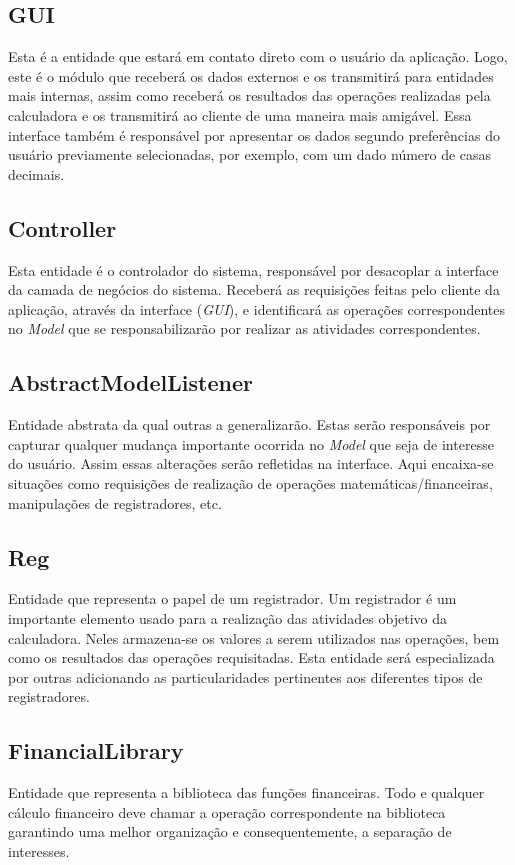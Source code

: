 \subsection{GUI}
Esta é a entidade que estará em contato direto com o usuário da aplicação. Logo, este é o módulo que receberá os dados externos e os transmitirá para entidades mais internas, assim como receberá os resultados das operações realizadas pela calculadora e os transmitirá ao cliente de uma maneira mais amigável. Essa interface também é responsável por apresentar os dados segundo preferências do usuário previamente selecionadas, por exemplo, com um dado número de casas decimais.

\subsection{Controller}
Esta entidade é o controlador do sistema, responsável por desacoplar a interface da camada de negócios do sistema. Receberá as requisições feitas pelo cliente da aplicação, através da interface (\textit{GUI}), e identificará as operações correspondentes no \textit{Model} que se responsabilizarão por realizar as atividades correspondentes.

\subsection{AbstractModelListener}
Entidade abstrata da qual outras a generalizarão. Estas serão responsáveis por capturar qualquer mudança importante ocorrida no \textit{Model} que seja de interesse do usuário. Assim essas alterações serão refletidas na interface. Aqui encaixa-se situações como requisições de realização de operações matemáticas/financeiras, manipulações de registradores, etc.

\subsection{Reg}
Entidade que representa o papel de um registrador. Um registrador é um importante elemento usado para a realização das atividades objetivo da calculadora. Neles armazena-se os valores a serem utilizados nas operações, bem como os resultados das operações requisitadas. Esta entidade será especializada por outras adicionando as particularidades pertinentes aos diferentes tipos de registradores.

\subsection{FinancialLibrary}
Entidade que representa a biblioteca das funções financeiras. Todo e qualquer cálculo financeiro deve chamar a operação correspondente na biblioteca garantindo uma melhor organização e consequentemente, a separação de interesses.

